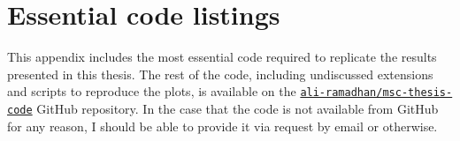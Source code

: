 \chapter{Essential code listings} \label{appx:code}

This appendix includes the most essential code required to replicate the results presented in this thesis. The rest of the code, including undiscussed extensions and scripts to reproduce the plots, is available on the \href{https://github.com/ali-ramadhan/msc-thesis-code}{\texttt{ali-ramadhan/msc-thesis-code}} GitHub repository. In the case that the code is not available from GitHub for any reason, I should be able to provide it via request by email or otherwise.


\inputminted{matlab}{CodeListings/hamiltonianDerivative.m}
\inputminted{matlab}{CodeListings/simulateMomenta.m}
\inputminted{matlab}{CodeListings/removeCOMMotion.m}
\inputminted{matlab}{CodeListings/rotateMomentum.m}
\inputminted{matlab}{CodeListings/lookupGeometries.m}
\inputminted{matlab}{CodeListings/multiStartTriatomic.m}